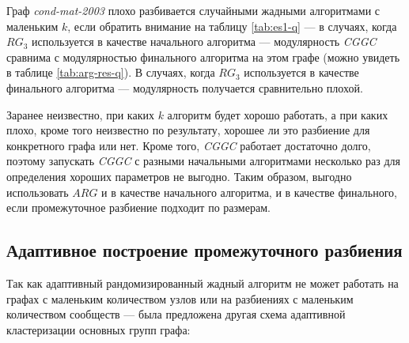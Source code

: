 Граф \emph{cond-mat-2003} плохо разбивается случайными жадными алгоритмами с маленьким $k$, если обратить внимание на таблицу \ref{tab:es1-q} --- в случаях, когда $RG_3$ используется в качестве начального алгоритма --- модулярность \emph{CGGC} сравнима с модулярностью финального алгоритма на этом графе (можно увидеть в таблице \ref{tab:arg-res-q}). В случаях, когда $RG_3$ используется в качестве финального алгоритма --- модулярность получается сравнительно плохой.

Заранее неизвестно, при каких $k$ алгоритм будет хорошо работать, а при каких плохо, кроме того неизвестно по результату, хорошее ли это разбиение для конкретного графа или нет. Кроме того, \emph{CGGC} работает достаточно долго, поэтому запускать \emph{CGGC} с разными начальными алгоритмами несколько раз для определения хороших параметров не выгодно. Таким образом, выгодно использовать $ARG$ и в качестве начального алгоритма, и в качестве финального, если промежуточное разбиение подходит по размерам.



\subsection{Адаптивное построение промежуточного разбиения}
\label{subsec:es-adaptive}

Так как адаптивный рандомизированный жадный алгоритм не может работать на графах с маленьким количеством узлов или на разбиениях с маленьким количеством сообществ --- была предложена другая схема адаптивной кластеризации основных групп графа:

